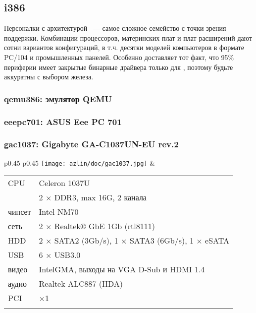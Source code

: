 
\subsection{i386}

Персоналки с архитектурой \ --- самое сложное семейство с точки
зрения поддержки. Комбинации процессоров, материнских плат и плат расширений
дают сотни вариантов конфигураций, в т.ч. десятки моделей компьютеров в формате
PC/104 и промышленных панелей. Особенно доставляет тот факт, что 95\% периферии
имеет закрытые бинарные драйвера только для \win, поэтому будьте аккуратны с
выбором железа.

\subsubsection{qemu386: эмулятор QEMU}


\subsubsection{eeepc701: ASUS Eee PC 701}


\subsubsection{gac1037: Gigabyte GA-C1037UN-EU rev.2}

\begin{tabular}{p{0.45\textheight} p{0.45\textheight}}
\texttt{[image: azlin/doc/gac1037.jpg]} &
\begin{tabular}{l l}
CPU & Celeron 1037U \\
\ram & 2 $\times$ DDR3, max 16G, 2 канала \\
чипсет & Intel NM70 \\
сеть & 2 $\times$ Realtek® GbE 1Gb (rtl8111) \\
HDD & 2 $\times$ SATA2 (3Gb/s), 1 $\times$ SATA3 (6Gb/s), 1 $\times$ eSATA\\
USB & 6 $\times$ USB3.0 \\
видео & IntelGMA, выходы на VGA D-Sub и HDMI 1.4\\
аудио & Realtek ALC887 (HDA) \\
PCI & $\times$1 \\
&\\
\end{tabular}
\\
\end{tabular}

